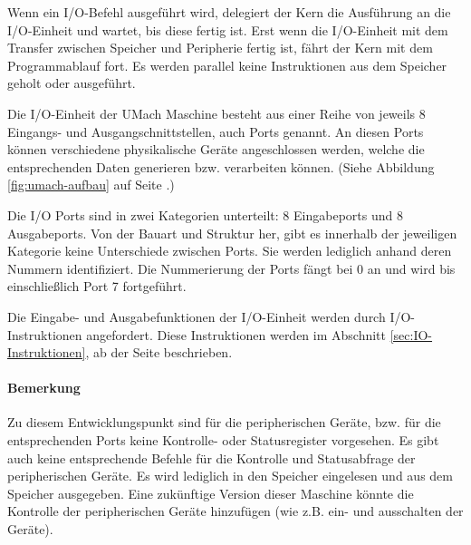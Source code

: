 Wenn ein I/O-Befehl ausgeführt wird, delegiert der Kern die Ausführung an die
I/O-Einheit und wartet, bis diese fertig ist. Erst wenn die I/O-Einheit
mit dem Transfer zwischen Speicher und Peripherie fertig ist, fährt der Kern mit
dem Programmablauf fort. Es werden parallel keine Instruktionen aus dem
Speicher geholt oder ausgeführt.


Die I/O-Einheit der UMach Maschine besteht aus einer Reihe von jeweils 8
Eingangs- und Ausgangschnittstellen, auch Ports
genannt. An diesen Ports können verschiedene physikalische Geräte angeschlossen
werden, welche die entsprechenden Daten generieren bzw. verarbeiten können.
(Siehe Abbildung \ref{fig:umach-aufbau} auf Seite \pageref{fig:umach-aufbau}.)


Die I/O Ports sind in zwei Kategorien unterteilt: 8 Eingabeports und 8
Ausgabeports. Von der Bauart und Struktur her, gibt es innerhalb der jeweiligen
Kategorie keine Unterschiede zwischen Ports. Sie werden lediglich anhand deren
Nummern identifiziert. Die Nummerierung der Ports fängt bei 0 an und wird bis
einschließlich Port 7 fortgeführt. 


Die Eingabe- und Ausgabefunktionen der I/O-Einheit werden durch
I/O-Instruktionen angefordert. Diese Instruktionen werden im Abschnitt
\ref{sec:IO-Instruktionen}, ab der Seite \pageref{sec:IO-Instruktionen}
beschrieben.


\paragraph{Bemerkung}
Zu diesem Entwicklungspunkt sind für die peripherischen Geräte, bzw. für die
entsprechenden Ports keine Kontrolle- oder Statusregister vorgesehen. Es gibt
auch keine entsprechende Befehle für die Kontrolle und Statusabfrage der
peripherischen Geräte. Es wird lediglich in den Speicher eingelesen und aus dem
Speicher ausgegeben. Eine zukünftige Version dieser Maschine könnte die
Kontrolle der peripherischen Geräte hinzufügen (wie z.B. ein- und ausschalten
der Geräte).

